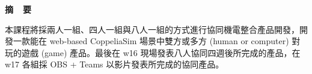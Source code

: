 \renewcommand{\baselinestretch}{1.5} %
\clearpage  %
\sectionef
{} %
\begin{center}
\LARGE\textbf{摘~~要}\\
\end{center}
\begin{flushleft}
\fontsize{14pt}{20pt}\sectionef\hspace{12pt}\quad 本課程將採兩人一組、四人一組與八人一組的方式進行協同機電整合產品開發，開發一款能在 web-based CoppeliaSim 場景中雙方或多方 (human or computer) 對玩的遊戲 (game) 產品。最後在 w16 現場發表八人協同四週後所完成的產品，在 w17 各組採 OBS + Teams 以影片發表所完成的協同產品。\\[12pt]

\end{flushleft}
